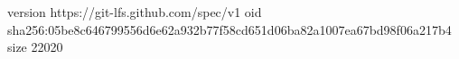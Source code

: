 version https://git-lfs.github.com/spec/v1
oid sha256:05be8c646799556d6e62a932b77f58cd651d06ba82a1007ea67bd98f06a217b4
size 22020
